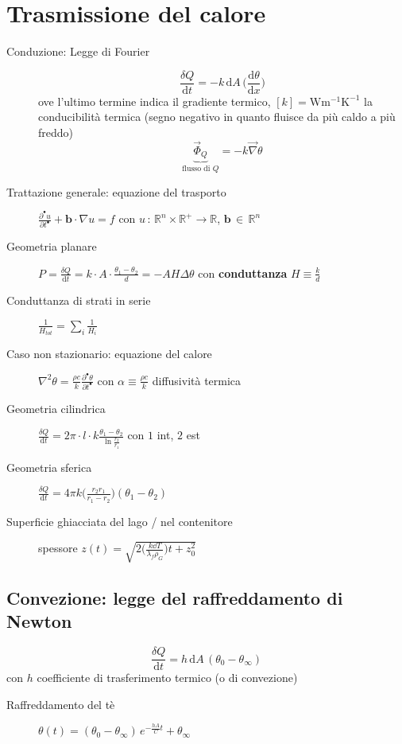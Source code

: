 \documentclass[10pt, oneside]{article}
\begin{document}
\section{Trasmissione del calore}
\begin{description}
\item[\large Conduzione: Legge di Fourier] 
\[\boxed{\frac{\delta Q}{\mathrm{d}t} = - k \, \mathrm{d}A \, \bigg(\frac{\mathrm{d}\theta}{\mathrm{d}x}\bigg)}\] ove l'ultimo termine indica il gradiente termico, $[k] = \mathrm{W m^{-1} K^{-1}}$ la conducibilità termica (segno negativo in quanto fluisce da più caldo a più freddo)
\[\underbrace{\vec{\Phi}_Q}_{\textrm{flusso di } Q} = - k \vec{\nabla} \theta\]
\item[Trattazione generale: equazione del trasporto] $\displaystyle \frac{\partial^{•} u}{\partial t^{•}} + \mathbf{b} \cdot \nabla u = f$ con $u \, : \, \mathbb{R}^n \times \mathbb{R}^+ \rightarrow \mathbb{R}$, $\mathbf{b} \, \in \, \mathbb{R}^n$
\item[Geometria planare] $\displaystyle P = \frac{\delta Q}{\mathrm{d} t} = k \cdot A \cdot \frac{\theta_1 - \theta_2}{d} = - A H \Delta \theta$ con \textbf{conduttanza} $\displaystyle H \equiv \frac{k}{d}$
\item[Conduttanza di strati in serie] $\displaystyle \frac{1}{H_{tot}} = \sum_i \frac{1}{H_i}$
\item[Caso non stazionario: equazione del calore] $\displaystyle \nabla^2 \theta = \frac{\rho c}{k} \frac{\partial^{•} \theta}{\partial t^{•}}$ con $\displaystyle \alpha \equiv \frac{\rho c}{k}$ diffusività termica
\item[Geometria cilindrica] $\displaystyle \frac{\delta Q}{\mathrm{d} t} = 2 \pi \cdot l \cdot k \frac{\theta_1 - \theta_2}{\displaystyle \ln \frac{r_2}{r_1}}$ con $1$ int, $2$ est
\item[Geometria sferica] $\displaystyle \frac{\delta Q}{\mathrm{d} t} = 4 \pi k \bigg(\frac{r_2 r_1}{r_1 - r_2}\bigg)(\theta_1 - \theta_2)$
\item[Superficie ghiacciata del lago / nel contenitore] spessore $\displaystyle z(t) = \sqrt{2 \bigg(\frac{k \dd{T}}{\lambda_f \rho_G	}\bigg) t + z_0^2}$
\end{description}
\begin{minipage}{0.6\textwidth}
\subsection*{Convezione: legge del raffreddamento di Newton}
\[\boxed{\frac{\delta Q}{\mathrm{d} t} = h \, \mathrm{d}A \,(\theta_0 - \theta_\infty)}\]
con $h$ coefficiente di trasferimento termico (o di convezione)
\begin{description}
\item[Raffreddamento del tè] $\displaystyle \theta(t) = (\theta_0 - \theta_\infty) \, e^{\displaystyle - \frac{hA}{C}t} + \theta_\infty$
\end{description}
\end{minipage}
\end{document}
